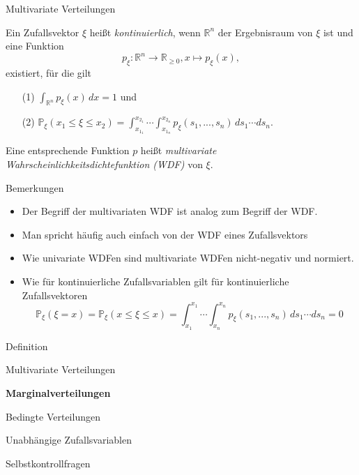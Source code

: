 \documentclass[
  8pt,
  ignorenonframetext,
]{beamer}
\providecommand{\tightlist}{%
  \setlength{\itemsep}{0pt}\setlength{\parskip}{0pt}}
\begin{document}
\begin{frame}{Multivariate Verteilungen}
\protect\hypertarget{multivariate-verteilungen-4}{}
\small
\begin{definition}
\justifying
Ein Zufallsvektor $\xi$ heißt \textit{kontinuierlich}, wenn $\mathbb{R}^n$ der 
Ergebnisraum von $\xi$ ist und eine Funktion  
\begin{equation}
p_\xi : \mathbb{R}^n \to \mathbb{R}_{\ge 0}, x \mapsto p_\xi(x),
\end{equation}
existiert, für die gilt
\begin{itemize}
\item[(1)] $\int_{\mathbb{R}^n} p_\xi(x)\,dx = 1$ und
\item[(2)] $\mathbb{P}_\xi(x_1 \le \xi \le x_2)
            = \int_{x_{1_1}}^{x_{2_1}} \cdots \int_{x_{1_n}}^{x_{2_n}} p_\xi(s_1,...,s_n)\,ds_1 \cdots ds_n$.
\end{itemize}
Eine entsprechende Funktion $p$ heißt \textit{multivariate Wahrscheinlichkeitsdichtefunktion (WDF)} von $\xi$.
\end{definition}

Bemerkungen

\begin{itemize}
\tightlist
\item
  Der Begriff der multivariaten WDF ist analog zum Begriff der WDF.
\item
  Man spricht häufig auch einfach von der WDF eines Zufallsvektors
\item
  Wie univariate WDFen sind multivariate WDFen nicht-negativ und
  normiert.
\item
  Wie für kontinuierliche Zufallsvariablen gilt für kontinuierliche
  Zufallsvektoren \begin{equation}
  \mathbb{P}_\xi(\xi = x)
  = \mathbb{P}_\xi(x \le \xi \le x)
  = \int_{x_1}^{x_1} \cdots \int_{x_n}^{x_n} p_\xi(s_1,...,s_n)\,ds_1 \cdots ds_n
  = 0
  \end{equation}
\end{itemize}
\end{frame}

\begin{frame}{}
\protect\hypertarget{section-7}{}
\large
{}
\vfill

Definition

Multivariate Verteilungen

\textbf{Marginalverteilungen}

Bedingte Verteilungen

Unabhängige Zufallsvariablen

Selbstkontrollfragen

\vfill
\end{frame}
\end{document}
